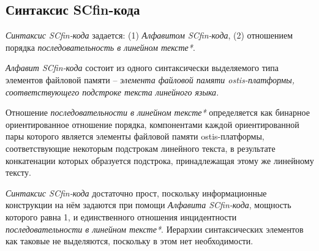 \subsection{Синтаксис SCfin-кода}
\label{sec_soft_platform_scfin_code_alphabet_and_syntax}

\textit{Синтаксис SCfin-кода} задается: (1) \textit{Алфавитом SCfin-кода}, (2) отношением порядка \textit{последовательность в линейном тексте*}.

\begin{SCn}
\begin{scneqtoset}
\end{scneqtoset}
\end{SCn}

\textit{Алфавит SCfin-кода\scnsupergroupsign} состоит из одного синтаксически выделяемого типа элементов файловой памяти -- \textit{элемента файловой памяти ostis-платформы, соответствующего подстроке текста линейного языка}.

\begin{SCn}
\end{SCn}

Отношение \textit{последовательности в линейном тексте*} определяется как бинарное ориентированное отношение порядка, компонентами каждой ориентированной пары которого является элементы файловой памяти ostis-платформы, соответствующие некоторым подстрокам линейного текста, в результате конкатенации которых образуется подстрока, принадлежащая этому же линейному тексту.

\textit{Синтаксис SCfin-кода} достаточно прост, поскольку информационные конструкции на нём задаются при помощи \textit{Алфавита SCfin-кода}, мощность которого равна 1, и единственного отношения инцидентности \textit{последовательности в линейном тексте*}. Иерархии синтаксических элементов как таковые не выделяются, поскольку в этом нет необходимости.

